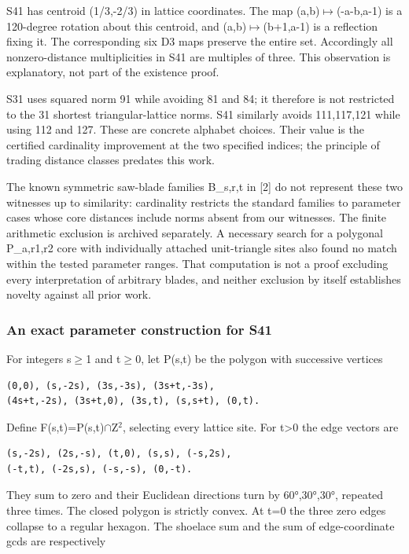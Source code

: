 \documentclass[
]{article}
\begin{document}
S41 has centroid (1/3,-2/3) in lattice coordinates. The map
(a,b)\ensuremath{\mapsto}(-a-b,a-1) is a 120-degree rotation about this centroid, and
(a,b)\ensuremath{\mapsto}(b+1,a-1) is a reflection fixing it. The corresponding six D3 maps
preserve the entire set. Accordingly all nonzero-distance multiplicities
in S41 are multiples of three. This observation is explanatory, not part
of the existence proof.

S31 uses squared norm 91 while avoiding 81 and 84; it therefore is not
restricted to the 31 shortest triangular-lattice norms. S41 similarly
avoids 111,117,121 while using 112 and 127. These are concrete alphabet
choices. Their value is the certified cardinality improvement at the two
specified indices; the principle of trading distance classes predates
this work.

The known symmetric saw-blade families B\_s,r,t in {[}2{]} do not
represent these two witnesses up to similarity: cardinality restricts
the standard families to parameter cases whose core distances include
norms absent from our witnesses. The finite arithmetic exclusion is
archived separately. A necessary search for a polygonal P\_a,r1,r2 core
with individually attached unit-triangle sites also found no match
within the tested parameter ranges. That computation is not a proof
excluding every interpretation of arbitrary blades, and neither
exclusion by itself establishes novelty against all prior work.

\subsubsection{An exact parameter construction for
S41}\label{an-exact-parameter-construction-for-s41}

For integers s\ensuremath{\ge}1 and t\ensuremath{\ge}0, let P(s,t) be the polygon with successive
vertices

\begin{verbatim}
(0,0), (s,-2s), (3s,-3s), (3s+t,-3s),
(4s+t,-2s), (3s+t,0), (3s,t), (s,s+t), (0,t).
\end{verbatim}

Define F(s,t)=P(s,t)\ensuremath{\cap}Z\ensuremath{{}^2}, selecting every lattice site. For
t\textgreater0 the edge vectors are

\begin{verbatim}
(s,-2s), (2s,-s), (t,0), (s,s), (-s,2s),
(-t,t), (-2s,s), (-s,-s), (0,-t).
\end{verbatim}

They sum to zero and their Euclidean directions turn by 60°,30°,30°,
repeated three times. The closed polygon is strictly convex. At t=0 the
three zero edges collapse to a regular hexagon. The shoelace sum and the
sum of edge-coordinate gcds are respectively
\end{document}
